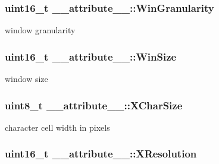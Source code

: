 \subsubsection[{\texorpdfstring{Win\+Granularity}{WinGranularity}}]{\setlength{\rightskip}{0pt plus 5cm}uint16\+\_\+t \+\_\+\+\_\+attribute\+\_\+\+\_\+\+::\+Win\+Granularity}\hypertarget{struct____attribute_____acc2114dbf039909e55cc3966abd3358d}{}\label{struct____attribute_____acc2114dbf039909e55cc3966abd3358d}


window granularity 

\subsubsection[{\texorpdfstring{Win\+Size}{WinSize}}]{\setlength{\rightskip}{0pt plus 5cm}uint16\+\_\+t \+\_\+\+\_\+attribute\+\_\+\+\_\+\+::\+Win\+Size}\hypertarget{struct____attribute_____ad26e754fe362f3085c7ec4c0e5e75a6f}{}\label{struct____attribute_____ad26e754fe362f3085c7ec4c0e5e75a6f}


window size 

\subsubsection[{\texorpdfstring{X\+Char\+Size}{XCharSize}}]{\setlength{\rightskip}{0pt plus 5cm}uint8\+\_\+t \+\_\+\+\_\+attribute\+\_\+\+\_\+\+::\+X\+Char\+Size}\hypertarget{struct____attribute_____acac41a300563737d7849a92cd1d5c10b}{}\label{struct____attribute_____acac41a300563737d7849a92cd1d5c10b}


character cell width in pixels 

\subsubsection[{\texorpdfstring{X\+Resolution}{XResolution}}]{\setlength{\rightskip}{0pt plus 5cm}uint16\+\_\+t \+\_\+\+\_\+attribute\+\_\+\+\_\+\+::\+X\+Resolution}\hypertarget{struct____attribute_____abe48e2b29aa99e813a1447d22711f4f4}{}\label{struct____attribute_____abe48e2b29aa99e813a1447d22711f4f4}


